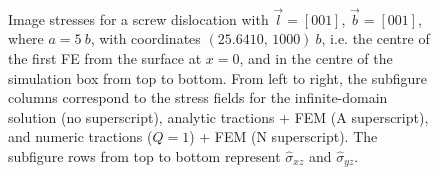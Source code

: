 \documentclass[11pt]{iopart}
\begin{document}
\begin{figure}
    ~
    ~
    ~
    \caption{Image stresses for a screw dislocation with $\vec{l} = [0 0 1]$, $\vec{b} = [0 0 1]$, where $a = 5~b$, with coordinates $(25.6410,\, 1000)~b$, i.e. the centre of the first FE from the surface at $x=0$, and in the centre of the simulation box from top to bottom. From left to right, the subfigure columns correspond to the stress fields for the infinite-domain solution (no superscript), analytic tractions + FEM (A superscript), and numeric tractions ($Q = 1$) + FEM (N superscript). The subfigure rows from top to bottom represent $\hat{\sigma}_{xz}$ and $\hat{\sigma}_{yz}$.}
    \label{f:head_vs_ana_vs_num_screw}
\end{figure}
\end{document}
